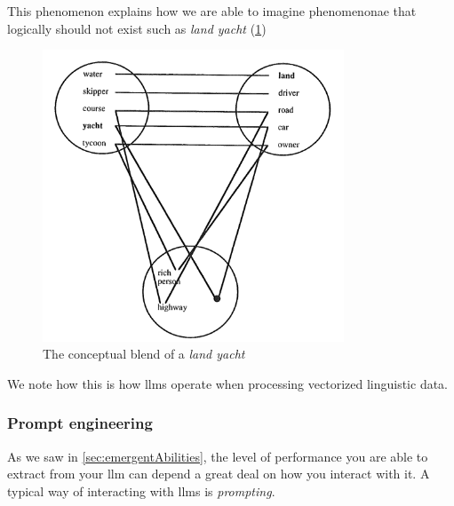 This phenomenon explains how we are able to imagine phenomenonae that logically
should not exist such as \textit{land yacht} (\cref{fig:landYacht})

\begin{figure}[h]
    \centering
    \includegraphics[width=0.8\textwidth]{media/landYacht.png}
    \caption[Land yacht conceptual blend]{The conceptual blend of a \textit{land
            yacht}\footnotemark}\label{fig:landYacht}
\end{figure}


We note how this is how \acrshort{llms} operate when processing vectorized
linguistic data.


\subsubsection{Prompt engineering}


As we saw in \cref{sec:emergentAbilities}, the level of performance you are able
to extract from your \acrlong{llm} can depend a great deal on how you interact
with it. A typical way of interacting with \acrshort{llms} is
\textit{prompting}.




